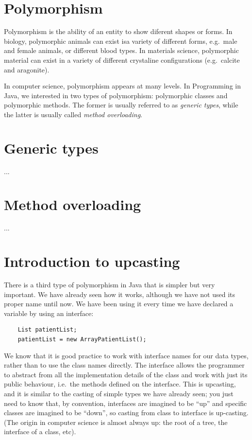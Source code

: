 
\section{Polymorphism}
\label{sec:polymorphyism}

Polymorphism is the ability of an entity to show diferent shapes or
forms. In biology, polymorphic animals can exist isa variety of
different forms, e.g.~male and female animals, or different blood
types. In materials science, polymorphic material can exist in a
variety of different crystaline configurations (e.g.~calcite and
aragonite). 

In computer science, polymorphism appears at many levels. In
Programming in Java, we interested in two types of polymorphism:
polymorphic classes and polymorphic methods. The former is usually
referred to as \emph{generic types}, while the latter is usually
called \emph{method overloading}. 

\section{Generic types}
\label{sec:generic-types}

...


\section{Method overloading}
\label{sec:method-overloading}

...

\section{Introduction to upcasting}
\label{sec:upcasting}

There is a third type of
polymorphism in Java that is simpler but very important. We have
already seen how it works, although we have not used its proper name
until now.
We have been using it every time we have declared
a variable by using an interface: 

\begin{verbatim}
    List patientList;
    patientList = new ArrayPatientList();
\end{verbatim}

We know that it is good practice to work with interface names for our
data types, rather than to use the class names directly. The interface
allows the programmer to abstract from all the implementation details
of the class and work with just its public behaviour, i.e.~the methods
defined on the interface. This is upcasting, and it is similar to the
casting of simple types we have already seen; you just need to know
that, by convention, interfaces are imagined to be ``up'' and specific
classes are imagined to be ``down'', so casting from class to
interface is up-casting. (The origin in computer science is almost
always up: the root of a tree, the interface of a class, etc). 

